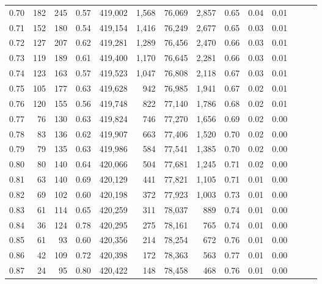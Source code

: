 \begin{tabular}{rrrrrrrrrrrrrr}
0.70 &     182 &    245 &  0.57 &  419,002 &    1,568 &  76,069 &   2,857 &  0.65 &  0.04 &      0.01 \\
0.71 &     152 &    180 &  0.54 &  419,154 &    1,416 &  76,249 &   2,677 &  0.65 &  0.03 &      0.01 \\
0.72 &     127 &    207 &  0.62 &  419,281 &    1,289 &  76,456 &   2,470 &  0.66 &  0.03 &      0.01 \\
0.73 &     119 &    189 &  0.61 &  419,400 &    1,170 &  76,645 &   2,281 &  0.66 &  0.03 &      0.01 \\
0.74 &     123 &    163 &  0.57 &  419,523 &    1,047 &  76,808 &   2,118 &  0.67 &  0.03 &      0.01 \\
0.75 &     105 &    177 &  0.63 &  419,628 &      942 &  76,985 &   1,941 &  0.67 &  0.02 &      0.01 \\
0.76 &     120 &    155 &  0.56 &  419,748 &      822 &  77,140 &   1,786 &  0.68 &  0.02 &      0.01 \\
0.77 &      76 &    130 &  0.63 &  419,824 &      746 &  77,270 &   1,656 &  0.69 &  0.02 &      0.00 \\
0.78 &      83 &    136 &  0.62 &  419,907 &      663 &  77,406 &   1,520 &  0.70 &  0.02 &      0.00 \\
0.79 &      79 &    135 &  0.63 &  419,986 &      584 &  77,541 &   1,385 &  0.70 &  0.02 &      0.00 \\
0.80 &      80 &    140 &  0.64 &  420,066 &      504 &  77,681 &   1,245 &  0.71 &  0.02 &      0.00 \\
0.81 &      63 &    140 &  0.69 &  420,129 &      441 &  77,821 &   1,105 &  0.71 &  0.01 &      0.00 \\
0.82 &      69 &    102 &  0.60 &  420,198 &      372 &  77,923 &   1,003 &  0.73 &  0.01 &      0.00 \\
0.83 &      61 &    114 &  0.65 &  420,259 &      311 &  78,037 &     889 &  0.74 &  0.01 &      0.00 \\
0.84 &      36 &    124 &  0.78 &  420,295 &      275 &  78,161 &     765 &  0.74 &  0.01 &      0.00 \\
0.85 &      61 &     93 &  0.60 &  420,356 &      214 &  78,254 &     672 &  0.76 &  0.01 &      0.00 \\
0.86 &      42 &    109 &  0.72 &  420,398 &      172 &  78,363 &     563 &  0.77 &  0.01 &      0.00 \\
0.87 &      24 &     95 &  0.80 &  420,422 &      148 &  78,458 &     468 &  0.76 &  0.01 &      0.00 \\

\end{tabular}
